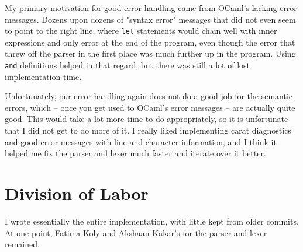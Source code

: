 My primary motivation for good error handling came from OCaml's lacking error messages. Dozens upon dozens of "syntax error" messages that did not even seem to point to the right line, where \lstinline|let| statements would chain well with inner expressions and only error at the end of the program, even though the error that threw off the parser in the first place was much further up in the program. Using \lstinline|and| definitions helped in that regard, but there was still a lot of lost implementation time.

Unfortunately, our error handling again does not do a good job for the semantic errors, which -- once you get used to OCaml's error messages -- are actually quite good. This would take a lot more time to do appropriately, so it is unfortunate that I did not get to do more of it. I really liked implementing carat diagnostics and good error messages with line and character information, and I think it helped me fix the parser and lexer much faster and iterate over it better.

\section{Division of Labor}
I wrote essentially the entire implementation, with little kept from older commits. At one point, Fatima Koly and Akshaan Kakar's for the parser and lexer remained.